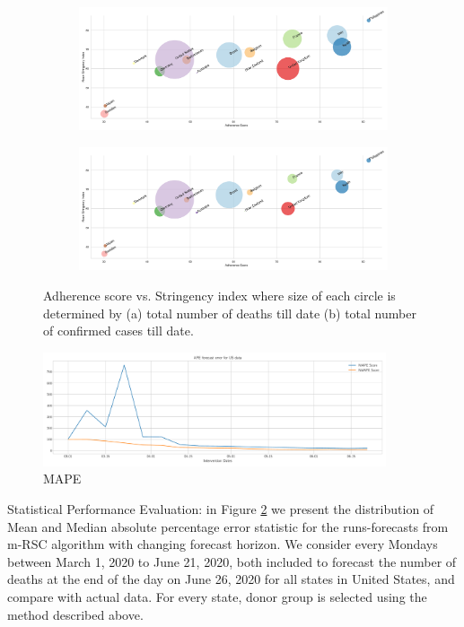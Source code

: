 \documentclass[preprint,authoryear,12pt]{elsarticle}
\begin{document}
    \begin{figure}
    	\centering
    	\begin{subfigure}[b]{\textwidth}
    		\centering
    		\includegraphics[width=0.9\linewidth]{score_death}
    	\end{subfigure}
    	
    	\begin{subfigure}[b]{\textwidth}
    		\centering
    		\includegraphics[width=0.9\linewidth]{score_confirmed}
    	\end{subfigure}
    	
    	\caption[Mobility Trends]{Adherence score vs. Stringency index where size of each circle is determined by (a) total number of deaths till date (b) total number of confirmed cases till date.}
    	\label{fig3} 
    \end{figure}

	\begin{figure}
	\centering
	\includegraphics[width=0.9\textwidth]{mape_us}
	\caption{MAPE} 
	\label{fig4} 
	\end{figure}

	Statistical Performance Evaluation: in Figure \ref{fig4} we present the distribution of Mean and Median absolute percentage error statistic for the runs-forecasts from m-RSC algorithm with changing forecast horizon. We consider every Mondays between March 1, 2020 to June 21, 2020, both included to forecast the number of deaths at the end of the day on June 26, 2020 for all states in United States, and compare with actual data. For every state, donor group is selected using the method described above. 
	
\end{document}
